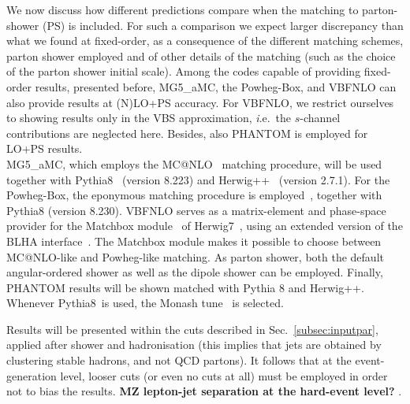 We now discuss how different predictions compare when the matching to parton-shower (PS) is included. For such
a comparison we expect larger discrepancy than what we found at fixed-order, as a consequence of the different
matching schemes, parton shower employed and of other details of the matching (such as the choice of the parton shower initial scale). Among
the codes capable of providing fixed-order results, presented before, {\sc MG5\_aMC}, the {\sc Powheg-Box}, and {\sc VBFNLO}
can also provide results at (N)LO+PS accuracy. For {\sc VBFNLO}, we
restrict ourselves to showing results only in the VBS approximation,
{\emph i.e.}\ the $s$-channel contributions are neglected here. Besides,
also {\sc PHANTOM} is employed for LO+PS results.\\
{\sc MG5\_aMC}, which
employs the {\sc MC@NLO}~\cite{Frixione:2002ik} matching procedure, will be used together with {\sc Pythia8}~\cite{Sjostrand:2014zea} (version 8.223)
and {\sc Herwig++}~\cite{Bahr:2008pv, Bellm:2013hwb} (version 2.7.1). For the {\sc Powheg-Box}, the eponymous  
matching procedure is employed~\cite{Nason:2004rx,Frixione:2007vw}, together with {\sc Pythia8} (version 8.230). {\sc VBFNLO} serves as a matrix-element and phase-space provider
for the {\sc Matchbox} module~\cite{Platzer:2011bc} of {\sc
Herwig7}~\cite{Bellm:2015jjp,Bellm:2017bvx}, using an extended version of the BLHA
interface~\cite{Binoth:2010xt,Alioli:2013nda,Andersen:2014efa}. The {\sc Matchbox} module makes it
possible to choose between {\sc MC\-@NLO}-like and {\sc Powheg}-like
matching. As parton shower, both the default angular-ordered shower as
well as the dipole shower can be employed.
Finally, {\sc PHANTOM} results will be shown matched with {\sc Pythia 8} and {\sc Herwig++}.
Whenever {\sc Pythia8}\ is used, the Monash tune~\cite{Skands:2014pea} is selected.

Results will be presented within the cuts described in Sec.~\ref{subsec:inputpar}, applied after shower and hadronisation (this implies that jets
are obtained by clustering stable hadrons, and not QCD partons). It follows that at the event-generation level, looser cuts (or even no cuts at all)
must be employed in order not to bias the results. {\bf MZ lepton-jet separation at the hard-event level?} .

